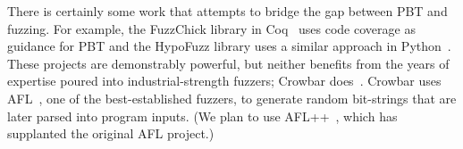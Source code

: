 There is certainly some work that attempts to bridge the gap between PBT and
fuzzing. For example, the FuzzChick library in Coq~\cite{OLDlampropoulos19fuzzchick}
uses code coverage as guidance for PBT and the HypoFuzz library uses a
similar approach in Python~\cite{hatfield-dodds_hypofuzz_nodate}. These projects
are demonstrably powerful, but neither benefits from the years of expertise
poured into industrial-strength fuzzers; Crowbar
does~\cite{dolan2017testing}. Crowbar uses
AFL~\cite{afl-readme}, one of the best-established
fuzzers, to generate random bit-strings that are later parsed into program
inputs.  (We plan to use AFL++~\cite{fioraldi_afl_2020},
which has supplanted the original AFL project.)  




